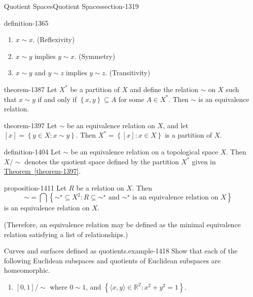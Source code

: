 \documentclass[oneside,10pt,]{article}
\newcommand{\tuple}[1]{\langle #1 \rangle}
\newcommand{\mb}{\mathbb}
\newcommand{\setBuilder}[2]{\left\{#1:#2\right\}}
\newcommand{\setList}[1]{\left\{#1\right\}}
\begin{document}
\begin{sectionptx}{Quotient Spaces}{}{Quotient Spaces}{}{}{section-1319}
\begin{definition}{}{definition-1365}
\leavevmode%
\begin{enumerate}
\item\hypertarget{li-1378}{}\(x\sim x\). (Reflexivity)%
\item\hypertarget{li-1380}{}\(x\sim y\) implies \(y\sim x\). (Symmetry)%
\item\hypertarget{li-1383}{}\(x\sim y\) and \(y\sim z\) implies \(y\sim z\). (Transitivity)%
\end{enumerate}
\end{definition}
\begin{theorem}{}{}{theorem-1387}%
\hypertarget{p-1388}{}%
Let \(X^*\) be a partition of \(X\) and define the relation \(\sim\) on \(X\) such that \(x\sim y\) if and only if \(\setList{x,y}\subseteq A\) for some \(A\in X^*\). Then \(\sim\) is an equivalence relation.%
\end{theorem}
\begin{theorem}{}{}{theorem-1397}%
\hypertarget{p-1398}{}%
Let \(\sim\) be an equivalence relation on \(X\), and let \([x]=\setBuilder{y\in X}{x\sim y}\). Then \(X^*=\setBuilder{[x]}{x\in X}\) is a partition of \(X\).%
\end{theorem}
\begin{definition}{}{definition-1404}%
\hypertarget{p-1405}{}%
Let \(\sim\) be an equivalence relation on a topological space \(X\). Then \(X/\sim\) denotes the quotient space defined by the partition \(X^*\) given in \hyperref[theorem-1397]{Theorem~\ref{theorem-1397}}.%
\end{definition}
\begin{proposition}{}{}{proposition-1411}%
\hypertarget{p-1412}{}%
Let \(R\) be a relation on \(X\). Then%
\begin{equation*}
\sim=\bigcap\setBuilder{\sim^\star\subseteq X^2}{R\subseteq\sim^\star\text{ and }\sim^\star
\text{ is an equivalence relation on }X}
\end{equation*}
is an equivalence relation on \(X\).%
\par
\hypertarget{p-1417}{}%
(Therefore, an equivalence relation may be defined as the minimal equivalence relation satisfying a list of relationships.)%
\end{proposition}
\begin{example}{Curves and surfaces defined as quotients.}{example-1418}%
\hypertarget{p-1420}{}%
Show that each of the following Euclidean subspaces and quotients of Euclidean subspaces are homeomorphic.%
\leavevmode%
\begin{enumerate}
\item\hypertarget{li-1422}{}\([0,1]/\sim\) where \(0\sim 1\), and \(\setBuilder{\tuple{x,y}\in\mb R^2}{x^2+y^2=1}\).%

\end{enumerate}
\end{example}
\end{sectionptx}
\end{document}
